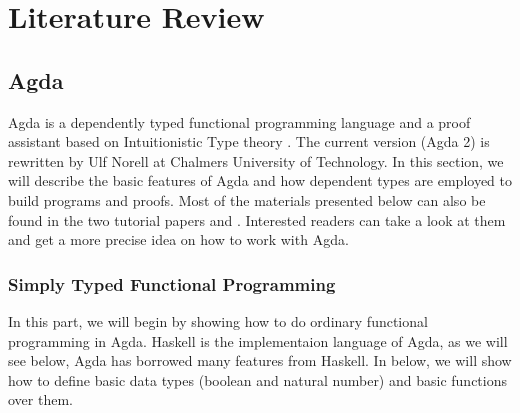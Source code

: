\documentclass[twoside,openright,final]{bhamthesis}
\begin{document}
\newpage
\section{Literature Review}

\subsection{Agda} 
\par Agda is a dependently typed functional programming language and a
proof assistant based on Intuitionistic Type theory
\cite{martin1984}. The current version (Agda 2) is rewritten by Ulf
Norell \cite{norell2007} at Chalmers University of
Technology. In this section, we will describe the basic features of
Agda and how dependent types are employed to build programs and
proofs. Most of the materials presented below can also be
found in the two tutorial papers \cite{bove2009} and
\cite{norell2009}. Interested readers can take a look at them and get
a more precise idea on how to work with Agda. 

\subsubsection{Simply Typed Functional Programming}
\par In this part, we will begin by showing how to do ordinary
functional programming in Agda. Haskell is the implementaion language
of Agda, as we will see below, Agda has borrowed many features from
Haskell. In below, we will show how to define basic data types
(boolean and natural number) and basic functions over them. 
\end{document}

